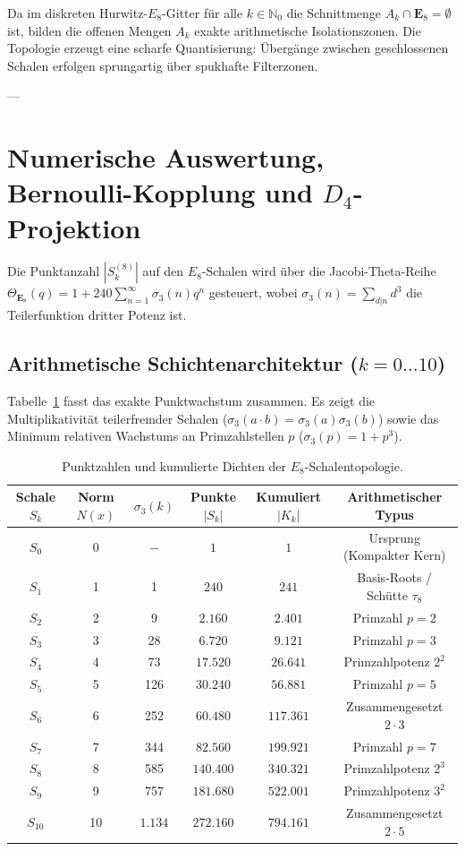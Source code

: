 \documentclass[11pt,a4paper]{article}
\begin{document}
	Da im diskreten Hurwitz-$E_8$-Gitter für alle $k \in \mathbb{N}_0$ die Schnittmenge $A_k \cap \mathbf{E}_8 = \emptyset$ ist, bilden die offenen Mengen $A_k$ exakte arithmetische Isolationszonen. Die Topologie erzeugt eine scharfe Quantisierung: Übergänge zwischen geschlossenen Schalen erfolgen sprungartig über spukhafte Filterzonen.
	
	---
	
	\section{Numerische Auswertung, Bernoulli-Kopplung und $D_4$-Projektion}
	
	Die Punktanzahl $|S_k^{(8)}|$ auf den $E_8$-Schalen wird über die Jacobi-Theta-Reihe $\Theta_{\mathbf{E}_8}(q) = 1 + 240 \sum_{n=1}^{\infty} \sigma_3(n) q^n$ gesteuert, wobei $\sigma_3(n) = \sum_{d|n} d^3$ die Teilerfunktion dritter Potenz ist.
	
	\subsection{Arithmetische Schichtenarchitektur ($k = 0 \dots 10$)}
	Tabelle~\ref{tab:shells} fasst das exakte Punktwachstum zusammen. Es zeigt die Multiplikativität teilerfremder Schalen ($\sigma_3(a \cdot b) = \sigma_3(a) \sigma_3(b)$) sowie das Minimum relativen Wachstums an Primzahlstellen $p$ ($\sigma_3(p) = 1 + p^3$).
	
	\begin{table}[h!]
		\centering
		\caption{Punktzahlen und kumulierte Dichten der $E_8$-Schalentopologie.}
		\label{tab:shells}
		\vspace{0.2cm}
		\begin{tabular}{cccccc}
			\toprule
			\textbf{Schale $S_k$} & \textbf{Norm $N(x)$} & \textbf{$\sigma_3(k)$} & \textbf{Punkte $|S_k|$} & \textbf{Kumuliert $|K_k|$} & \textbf{Arithmetischer Typus} \\
			\midrule
			$S_0$ & 0 & $-$ & $1$ & $1$ & Ursprung (Kompakter Kern) \\
			$S_1$ & 1 & 1 & $240$ & $241$ & Basis-Roots / Schütte $\tau_8$ \\
			$S_2$ & 2 & 9 & $2.160$ & $2.401$ & Primzahl $p=2$ \\
			$S_3$ & 3 & 28 & $6.720$ & $9.121$ & Primzahl $p=3$ \\
			$S_4$ & 4 & 73 & $17.520$ & $26.641$ & Primzahlpotenz $2^2$ \\
			$S_5$ & 5 & 126 & $30.240$ & $56.881$ & Primzahl $p=5$ \\
			$S_6$ & 6 & 252 & $60.480$ & $117.361$ & Zusammengesetzt $2 \cdot 3$ \\
			$S_7$ & 7 & 344 & $82.560$ & $199.921$ & Primzahl $p=7$ \\
			$S_8$ & 8 & 585 & $140.400$ & $340.321$ & Primzahlpotenz $2^3$ \\
			$S_9$ & 9 & 757 & $181.680$ & $522.001$ & Primzahlpotenz $3^2$ \\
			$S_{10}$ & 10 & $1.134$ & $272.160$ & $794.161$ & Zusammengesetzt $2 \cdot 5$ \\
			\bottomrule
		\end{tabular}
	\end{table}
	
\end{document}
